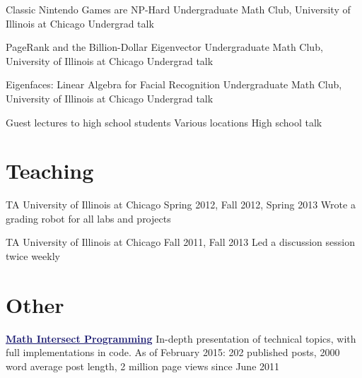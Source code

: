 \documentclass[11pt]{moderncv}
\begin{document}
         {Classic Nintendo Games are NP-Hard}
      {Undergraduate Math Club, University of Illinois at Chicago}
      {Undergrad talk}
      {}
{}

         {PageRank and the Billion-Dollar Eigenvector}
      {Undergraduate Math Club, University of Illinois at Chicago}
      {Undergrad talk}
      {}
{}

         {Eigenfaces: Linear Algebra for Facial Recognition}
      {Undergraduate Math Club, University of Illinois at Chicago}
      {Undergrad talk}
      {}
{}

         {Guest lectures to high school students}
      {Various locations}
      {High school talk}
      {}
{}


   \section{Teaching}
         {TA}
      {University of Illinois at Chicago}
      {Spring 2012, Fall 2012, Spring 2013}
      {}
      {Wrote a grading robot for all labs and projects}

         {TA}
      {University of Illinois at Chicago}
      {Fall 2011, Fall 2013}
      {}
      {Led a discussion session twice weekly}


   \section{Other}
         {\href{http://jeremykun.com}{\textcolor{MidnightBlue}{\underline{\textbf{Math Intersect Programming}}}}}
      {}
      {In-depth presentation of technical topics, with full implementations in code. As of February 2015: 202 published posts, 2000 word average post length, 2 million page views since June 2011}
      {}
      {}
\end{document}
